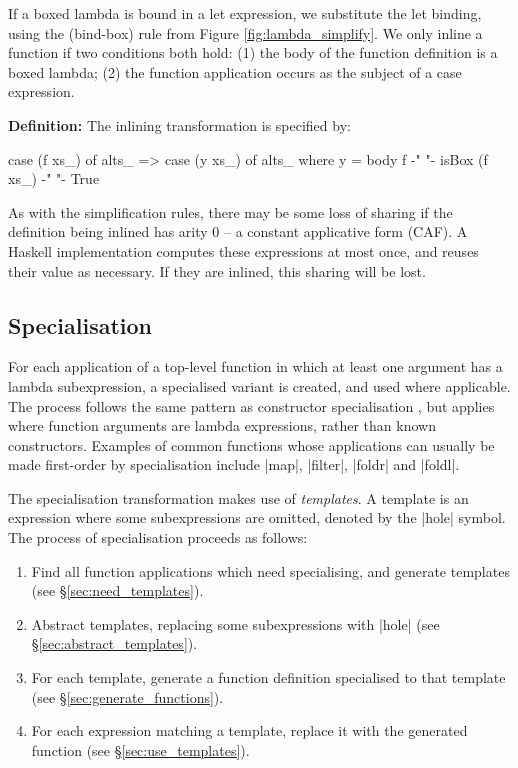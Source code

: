 \documentclass[preprint]{sigplanconf}
\newenvironment{definition}
    {\smallskip
     \noindent\textbf{Definition:}}
    {\noexample}
\begin{document}
If a boxed lambda is bound in a let expression, we substitute the let binding, using the (bind-box) rule from Figure \ref{fig:lambda_simplify}. We only inline a function if two conditions both hold: (1) the body of the function definition is a boxed lambda; (2) the function application occurs as the subject of a case expression.

\begin{definition}
The inlining transformation is specified by:

\ignore\begin{code}
case (f xs_) of alts_
    => case (y xs_) of alts_
    where
        y = body f
        {-"  "-} isBox (f xs_) {-"  "-} True
\end{code}\codeexample
\end{definition}\bigskip

As with the simplification rules, there may be some loss of sharing if the definition being inlined has arity 0 -- a constant applicative form (CAF). A Haskell implementation computes these expressions at most once, and reuses their value as necessary. If they are inlined, this sharing will be lost.

\subsection{Specialisation}

For each application of a top-level function in which at least one argument has a lambda subexpression, a specialised variant is created, and used where applicable. The process follows the same pattern as constructor specialisation \cite{spj:specconstr}, but applies where function arguments are lambda expressions, rather than known constructors. Examples of common functions whose applications can usually be made first-order by specialisation include |map|, |filter|, |foldr| and |foldl|.

The specialisation transformation makes use of \textit{templates}. A template is an expression where some subexpressions are omitted, denoted by the |hole| symbol. The process of specialisation proceeds as follows:

\begin{enumerate}
\item Find all function applications which need specialising, and generate templates (see \S\ref{sec:need_templates}).
\item Abstract templates, replacing some subexpressions with |hole| (see \S\ref{sec:abstract_templates}).
\item For each template, generate a function definition specialised to that template (see \S\ref{sec:generate_functions}).
\item For each expression matching a template, replace it with the generated function (see \S\ref{sec:use_templates}).
\end{enumerate}
\end{document}
